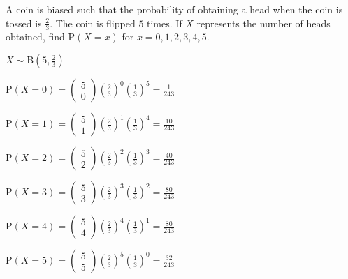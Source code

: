 \documentclass[11pt,a4paper]{book}
\begin{document}
\begin{example}

A coin is biased such that the probability of obtaining a head when
the coin is tossed is ${\displaystyle \frac{2}{3}}$. The coin is
flipped $5$ times. If $X$ represents the number of heads obtained,
find $\text{P}\left(X=x\right)$ for $x=0,1,2,3,4,5$.

\Solution

${\displaystyle X\sim\text{B}\left(5,\frac{2}{3}\right)}$

\begin{minipage}[t]{.5\textwidth}

${\displaystyle \text{P}\left(X=0\right)=\begin{pmatrix}5\\
0
\end{pmatrix}\left(\frac{2}{3}\right)^{0}\left(\frac{1}{3}\right)^{5}=\frac{1}{243}}$

${\displaystyle \text{P}\left(X=1\right)=\begin{pmatrix}5\\
1
\end{pmatrix}\left(\frac{2}{3}\right)^{1}\left(\frac{1}{3}\right)^{4}=\frac{10}{243}}$

${\displaystyle \text{P}\left(X=2\right)=\begin{pmatrix}5\\
2
\end{pmatrix}\left(\frac{2}{3}\right)^{2}\left(\frac{1}{3}\right)^{3}=\frac{40}{243}}$

\end{minipage}
\begin{minipage}[t]{.5\textwidth}

${\displaystyle \text{P}\left(X=3\right)=\begin{pmatrix}5\\
3
\end{pmatrix}\left(\frac{2}{3}\right)^{3}\left(\frac{1}{3}\right)^{2}=\frac{80}{243}}$

${\displaystyle \text{P}\left(X=4\right)=\begin{pmatrix}5\\
4
\end{pmatrix}\left(\frac{2}{3}\right)^{4}\left(\frac{1}{3}\right)^{1}=\frac{80}{243}}$

${\displaystyle \text{P}\left(X=5\right)=\begin{pmatrix}5\\
5
\end{pmatrix}\left(\frac{2}{3}\right)^{5}\left(\frac{1}{3}\right)^{0}=\frac{32}{243}}$

\end{minipage}

\end{example}
\end{document}
